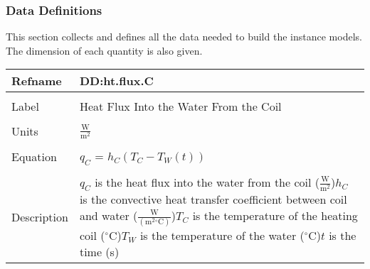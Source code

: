 \documentclass[12pt]{article}
\begin{document}
\subsubsection{Data Definitions}
\label{Sec:DDs}
This section collects and defines all the data needed to build the instance models. The dimension of each quantity is also given.
~\newline
\noindent \begin{minipage}{\textwidth}
\begin{tabular}{p{} p{}}
\toprule \textbf{Refname} & \textbf{DD:ht.flux.C}
\label{DD:ht.flux.C}
\\ \midrule \\
Label & Heat Flux Into the Water From the Coil
\\ \midrule \\
Units & $\frac{\text{W}}{\text{m}^{2}}$
\\ \midrule \\
Equation & ${q_{C}}$ = ${h_{C}} \left({T_{C}}-{T_{W}}\left(t\right)\right)$
\\ \midrule \\
Description & ${q_{C}}$ is the heat flux into the water from the coil ($\frac{\text{W}}{\text{m}^{2}}$)\newline${h_{C}}$ is the convective heat transfer coefficient between coil and water ($\frac{\text{W}}{(\text{m}^{2}{}^{\circ}\text{C})}$)\newline${T_{C}}$ is the temperature of the heating coil (${}^{\circ}$C)\newline${T_{W}}$ is the temperature of the water (${}^{\circ}$C)\newline$t$ is the time (s)
\\ \bottomrule \end{tabular}
\end{minipage}\\
~\newline
\end{document}
